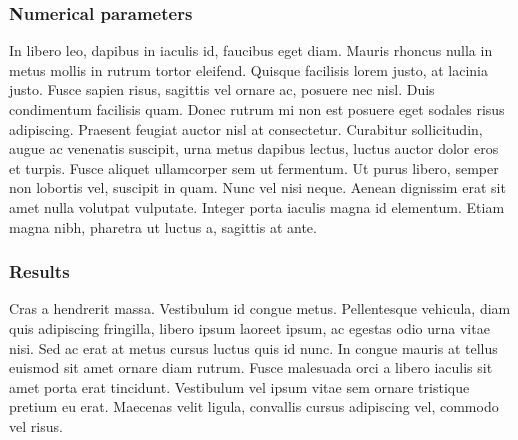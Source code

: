 \subsubsection{Numerical parameters}
%
In libero leo, dapibus in iaculis id, faucibus eget diam. Mauris rhoncus nulla
in metus mollis in rutrum tortor eleifend. Quisque facilisis lorem justo, at
lacinia justo. Fusce sapien risus, sagittis vel ornare ac, posuere nec nisl.
Duis condimentum facilisis quam. Donec rutrum mi non est posuere eget sodales
risus adipiscing. Praesent feugiat auctor nisl at consectetur. Curabitur
sollicitudin, augue ac venenatis suscipit, urna metus dapibus lectus, luctus
auctor dolor eros et turpis. Fusce aliquet ullamcorper sem ut fermentum. Ut
purus libero, semper non lobortis vel, suscipit in quam. Nunc vel nisi neque.
Aenean dignissim erat sit amet nulla volutpat vulputate. Integer porta iaculis
magna id elementum. Etiam magna nibh, pharetra ut luctus a, sagittis at ante.
%
%
\subsubsection{Results}
%
Cras a hendrerit massa. Vestibulum id congue metus. Pellentesque vehicula,
diam quis adipiscing fringilla, libero ipsum laoreet ipsum, ac egestas odio
urna vitae nisi. Sed ac erat at metus cursus luctus quis id nunc. In congue
mauris at tellus euismod sit amet ornare diam rutrum. Fusce malesuada orci a
libero iaculis sit amet porta erat tincidunt. Vestibulum vel ipsum vitae sem
ornare tristique pretium eu erat. Maecenas velit ligula, convallis cursus
adipiscing vel, commodo vel risus.


